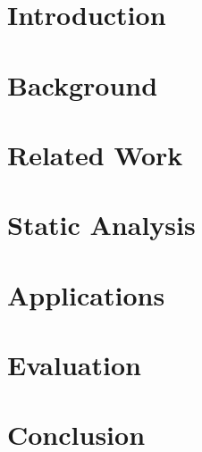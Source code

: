 \documentclass[12pt,a4paper]{report}
\begin{document}



\blankpage



\afterpage{\blankpage}



\afterpage{\blankpage}

\tableofcontents
\listoffigures

\clearpage


\chapter{Introduction}



\chapter{Background}



\chapter{Related Work}



\chapter{Static Analysis}



\chapter{Applications}



\chapter{Evaluation}



\chapter{Conclusion}



\printbibliography
\end{document}
